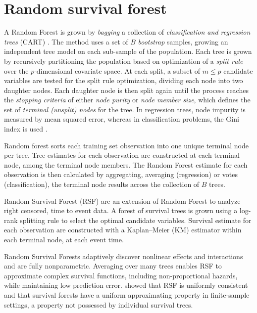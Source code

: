 \documentclass[article, nojss]{jss}
\begin{document}
\section{Random survival forest}\label{random-survival-forest}

A Random Forest \citep{Breiman:2001} is grown by \emph{bagging}
\citep{Breiman:1996} a collection of
\emph{classification and regression trees} (CART) \citep{cart:1984}. The
method uses a set of \(B\) \emph{bootstrap} \citep{bootstrap:1994}
samples, growing an independent tree model on each sub-sample of the
population. Each tree is grown by recursively partitioning the
population based on optimization of a \emph{split rule} over the
\(p\)-dimensional covariate space. At each split, a subset of
\(m \le p\) candidate variables are tested for the split rule
optimization, dividing each node into two daughter nodes. Each daughter
node is then split again until the process reaches the
\emph{stopping criteria} of either \emph{node purity} or
\emph{node member size}, which defines the set of
\emph{terminal (unsplit) nodes} for the tree. In regression trees, node
impurity is measured by mean squared error, whereas in classification
problems, the Gini index is used \citep{Friedman:2000}.

Random forest sorts each training set observation into one unique
terminal node per tree. Tree estimates for each observation are
constructed at each terminal node, among the terminal node members. The
Random Forest estimate for each observation is then calculated by
aggregating, averaging (regression) or votes (classification), the
terminal node results across the collection of \(B\) trees.

Random Survival Forest \citep{Ishwaran:2007, Ishwaran:2008} (RSF) are an
extension of Random Forest to analyze right censored, time to event
data. A forest of survival trees is grown using a log-rank splitting
rule to select the optimal candidate variables. Survival estimate for
each observation are constructed with a Kaplan--Meier (KM) estimator
within each terminal node, at each event time.

Random Survival Forests adaptively discover nonlinear effects and
interactions and are fully nonparametric. Averaging over many trees
enables RSF to approximate complex survival functions, including
non-proportional hazards, while maintaining low prediction error.
\citep{Ishwaran:2010a} showed that RSF is uniformly consistent and that
survival forests have a uniform approximating property in finite-sample
settings, a property not possessed by individual survival trees.
\end{document}
